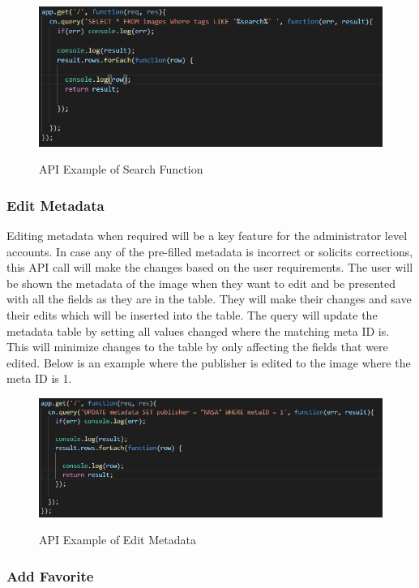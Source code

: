 \documentclass[12pt]{report}
\begin{document}
\begin{figure}[h]
	\centering
	\caption{API Example of Search Function}
	\includegraphics[scale=0.5]{api_search}
	\label{fig:API Search}
\end{figure}

\subsubsection*{Edit Metadata}

Editing metadata when required will be a key feature for the administrator level accounts.  In case any of the pre-filled metadata is incorrect or solicits corrections, this API call will make the changes based on the user requirements.  The user will be shown the metadata of the image when they want to edit and be presented with all the fields as they are in the table.  They will make their changes and save their edits which will be inserted into the table.  The query will update the metadata table by setting all values changed where the matching meta ID is.  This will minimize changes to the table by only affecting the fields that were edited.  Below is an example where the publisher is edited to the image where the meta ID is 1.

\begin{figure}[h]
	\centering
	\caption{API Example of Edit Metadata}
	\includegraphics[scale=0.5]{api_edit_metadata}
	\label{fig:API Edit Metadata}
\end{figure}

\subsubsection*{Add Favorite}
\end{document}
